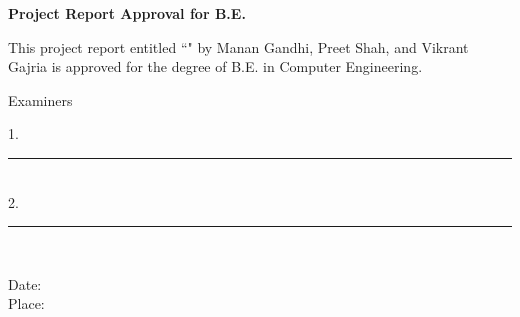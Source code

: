 \begingroup
\makeatletter

\thispagestyle{plain}
\setlength{\parindent}{0pt}
\linespread{1.5}
\fontsize{14pt}{16pt} \selectfont

\centerline{\Huge\bf Project Report Approval for B.E.}
\vspace{4pt}

This project report entitled {\Huge ``\@title"} by {\Huge Manan Gandhi, Preet Shah, and Vikrant Gajria} is approved for the degree of B.E. in Computer Engineering. 

\begin{flushright}
    \vspace{1in}
    \parbox{5.5cm}{Examiners \hfill}
    
    \vspace{0.7in}
    1.
    \rule{5cm}{1pt} \\
    
    \vspace{0.7in}
    2.
    \rule{5cm}{1pt} \\
\end{flushright}

\vfill
\begin{flushleft}
Date: \\
Place: 
\end{flushleft}

%
\pagebreak

\endgroup
\makeatother
